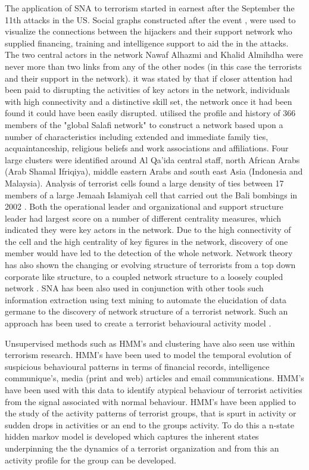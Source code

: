 The application of SNA to terrorism started in earnest after the September the 11th attacks in the US. Social graphs constructed after the event \citep{krebs2002mapping}, \citep{krebs2002uncloaking}  were used to visualize the connections between the hijackers and their support network who supplied financing, training and intelligence support to aid the in the attacks. The two central actors in the  network Nawaf Alhazmi and Khalid Almihdha were never more than two links from any of the other nodes (in this case the terrorists and their support in the network). it was stated by \citep{krebs2002mapping} that if closer attention had been paid to disrupting the activities of key actors in the network, individuals with high connectivity and a distinctive skill set, the network once it had been found it could have been easily disrupted. \citep{sageman2004understanding} utilised the profile and history of 366 members of the "global Salafi network" to construct a network based upon a number of characteristics including extended and immediate family ties, acquaintanceship, religious beliefs and work associations and affiliations. Four large clusters were identified around Al Qa'ida central staff, north African Arabs (Arab Shamal Ifriqiya), middle eastern Arabs and south east Asia (Indonesia and Malaysia). Analysis of terrorist cells found a large density of ties between 17 members of a large Jemaah Islamiyah cell that carried out the Bali bombings in 2002 \citep{koschade2006social}. Both the operational leader and organizational and support structure leader had largest score on a number of different centrality measures, which indicated they were key actors in the network. Due to the high connectivity of the cell and the high centrality of key figures in the network, discovery of one member would have led to the detection of the whole network. Network theory has also shown the changing or evolving structure of terrorists from a top down corporate like structure, to a coupled network structure to a loosely coupled network \citep{jackson2006groups}. SNA has been also used in conjunction with other tools such information extraction using text mining to automate the elucidation of data germane to the discovery of network structure of a terrorist network. Such an approach has been used to create a terrorist behavioural activity model \citep{ball2016automating}.

Unsupervised methods such as HMM's and clustering have also seen use within terrorism research. HMM's have been used to model the temporal evolution of suspicious behavioural patterns in terms of financial records, intelligence communique's, media (print and web) articles and email communications. HMM's have been used with this data to identify atypical behaviour of terrorist activities from the signal associated with normal behaviour\citep{allanach2004detecting}. HMM's have been applied to the study of the activity patterns of terrorist groups, that is spurt in activity or sudden drops in activities or an end to the groups activity. To do this a n-state hidden markov model is developed which captures the inherent states underpinning the the dynamics of a terrorist organization and from this an activity profile for the group can be developed.

